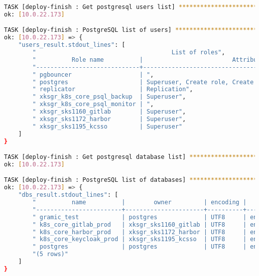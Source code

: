 \begin{flushleft}
\begin{lstlisting}[language=bash, caption=Deploy - Anhang - Deployt,captionpos=b,label={lst:deploy-appendix-deployt},breaklines=true]
TASK [deploy-finish : Get postgresql users list] ******************************************************************************************************************************************************************
ok: [10.0.22.173]

TASK [deploy-finish : PostgreSQL list of users] *******************************************************************************************************************************************************************
ok: [10.0.22.173] => {
    "users_result.stdout_lines": [
        "                                      List of roles",
        "          Role name          |                         Attributes                         ",
        "-----------------------------+------------------------------------------------------------",
        " pgbouncer                   | ",
        " postgres                    | Superuser, Create role, Create DB, Replication, Bypass RLS",
        " replicator                  | Replication",
        " xksgr_k8s_core_psql_backup  | Superuser",
        " xksgr_k8s_core_psql_monitor | ",
        " xksgr_sks1160_gitlab        | Superuser",
        " xksgr_sks1172_harbor        | Superuser",
        " xksgr_sks1195_kcsso         | Superuser"
    ]
}

TASK [deploy-finish : Get postgresql database list] ***************************************************************************************************************************************************************
ok: [10.0.22.173]

TASK [deploy-finish : PostgreSQL list of databases] ***************************************************************************************************************************************************************
ok: [10.0.22.173] => {
    "dbs_result.stdout_lines": [
        "          name          |        owner         | encoding |   collate   |    ctype    |  size   | tablespace ",
        "------------------------+----------------------+----------+-------------+-------------+---------+------------",
        " gramic_test            | postgres             | UTF8     | en_US.UTF-8 | en_US.UTF-8 | 7492 kB | pg_default",
        " k8s_core_gitlab_prod   | xksgr_sks1160_gitlab | UTF8     | en_US.UTF-8 | en_US.UTF-8 | 7492 kB | pg_default",
        " k8s_core_harbor_prod   | xksgr_sks1172_harbor | UTF8     | en_US.UTF-8 | en_US.UTF-8 | 7492 kB | pg_default",
        " k8s_core_keycloak_prod | xksgr_sks1195_kcsso  | UTF8     | en_US.UTF-8 | en_US.UTF-8 | 7492 kB | pg_default",
        " postgres               | postgres             | UTF8     | en_US.UTF-8 | en_US.UTF-8 | 7492 kB | pg_default",
        "(5 rows)"
    ]
}


\end{lstlisting}
\end{flushleft}
